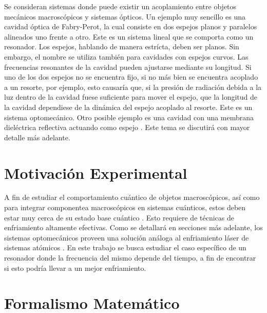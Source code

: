 \documentclass[a4paper,10pt]{report}
\begin{document}
Se consideran sistemas donde puede existir un acoplamiento entre objetos mecánicos macroscópicos y sistemas ópticos. Un ejemplo muy sencillo es una cavidad óptica de Fabry-Perot, la cual consiste en dos espejos planos y paralelos alineados uno frente a otro. Este es un sistema lineal que se comporta como un resonador. Los espejos, hablando de manera estrícta, deben ser planos. Sin embargo, el nombre se utiliza también para cavidades con espejos curvos\cite{PaschottaFP}. Las frecuencias resonantes de la cavidad pueden ajustarse mediante su longitud. Si uno de los dos espejos no se encuentra fijo, si no más bien se encuentra acoplado a un resorte, por ejemplo, esto causaría que, si la presión de radiación debida a la luz dentro de la cavidad fuese suficiente para mover el espejo, que la longitud de la cavidad dependiese de la dinámica del espejo acoplado al resorte. Este es un sistema optomecánico. Otro posible ejemplo es una cavidad con una membrana dieléctrica reflectiva actuando como espejo \cite{JockelMR}. Este tema se discutirá con mayor detalle más adelante.

\section{Motivación Experimental}

A fin de estudiar el comportamiento cuántico de objetos macroscópicos, así como para integrar componentea macroscópicos en sistemas cuánticos, estos deben estar muy cerca de su estado base cuántico \cite{ChanQM}. Esto requiere de técnicas de enfriamiento altamente efectivas. Como se detallará en secciones más adelante, los sistemas optomecánicos proveen una solución análoga al enfriamiento láser de sistemas atómicos \cite{NooshiLC}. En este trabajo se busca estudiar el caso específico de un resonador donde la frecuencia del mismo depende del tiempo, a fin de encontrar si esto podría llevar a un mejor enfriamiento.


\section{Formalismo Matemático}
\end{document}
